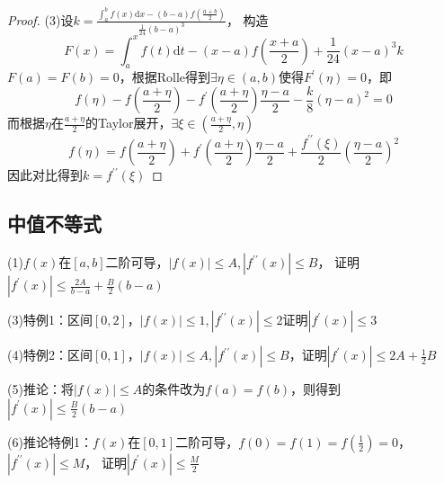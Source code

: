 \begin{proof}
  (3)设$k = \frac{\int_a^b f(x)\mathrm{d} x - (b - a) f \left( \frac{a+b}{2} \right)}{\frac{1}{24}(b - a)^3}$，
  构造
  \begin{equation*}
    F(x) = \int_a^x f(t)\mathrm{d} t - (x - a)f \left( \frac{x + a}{2} \right) + \frac{1}{24}(x - a)^3k
  \end{equation*}
  $F(a) = F(b) = 0$，根据Rolle得到$\exists \eta \in (a,b)$使得$F^{\prime}(\eta) = 0$，即
  \begin{equation*}
    f(\eta) - f \left( \frac{a + \eta}{2} \right) - f^{\prime} \left( \frac{a + \eta}{2} \right) \frac{\eta - a}{2} - \frac{k}{8}(\eta - a)^2 = 0
  \end{equation*}
  而根据$\eta$在$\frac{a + \eta}{2}$的Taylor展开，$\exists \xi \in \left( \frac{a + \eta}{2}, \eta \right)$
  \begin{equation*}
    f(\eta) = f \left( \frac{a + \eta}{2} \right) + f^{\prime} \left( \frac{a + \eta}{2} \right) \frac{\eta - a}{2} + \frac{f^{\prime\prime}(\xi)}{2} \left( \frac{\eta - a}{2} \right)^2
  \end{equation*}
  因此对比得到$k = f^{\prime\prime}(\xi)$
\end{proof}

\subsection{中值不等式}

\begin{exercise}[基于Taylor展开]
  (1)$f(x)$在$[a,b]$二阶可导，$|f(x)| \leq A, |f^{\prime\prime}(x)| \leq B$，
  证明$|f^{\prime}(x)| \leq \frac{2A}{b - a} + \frac{B}{2}(b - a)$

  (3)特例1：区间$[0,2]$，$|f(x)| \leq 1, |f^{\prime\prime}(x)| \leq 2$证明$|f^{\prime}(x)| \leq 3$

  (4)特例2：区间$[0,1]$，$|f(x)| \leq A, |f^{\prime\prime}(x)| \leq B$，证明$|f^{\prime}(x)| \leq 2A + \frac{1}{2}B$

  (5)推论：将$|f(x)| \leq A$的条件改为$f(a) = f(b)$，则得到$|f^{\prime}(x)| \leq \frac{B}{2}(b - a)$
  
  (6)推论特例1：$f(x)$在$[0,1]$二阶可导，$f(0) = f(1) = f(\frac{1}{2}) = 0$，
  $|f^{\prime\prime}(x)| \leq M$，
  证明$|f^{\prime}(x)| \leq \frac{M}{2}$
\end{exercise}

